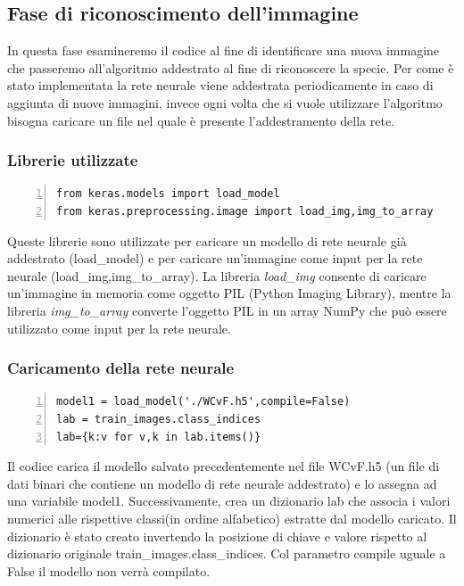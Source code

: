 \documentclass[a4paper,final,12pt]{report}
\begin{document}
\subsection{Fase di riconoscimento dell'immagine}
In questa fase esamineremo il codice al fine di identificare una nuova immagine che passeremo all'algoritmo addestrato al fine di riconoscere la specie. Per come è stato implementata la rete neurale viene addestrata periodicamente in caso di aggiunta di nuove immagini, invece ogni volta che si vuole utilizzare l'algoritmo bisogna caricare un file nel quale è presente l'addestramento della rete.

\subsubsection{Librerie utilizzate}
\begin{lstlisting}[caption={Librerie per il riconosciemtno dell'immagine.}, label={lst:librerie_riconoscimento}, breaklines, escapechar=`\%, frame=lines, basicstyle=\small\ttfamily, keepspaces=true, numbers=left]
from keras.models import load_model
from keras.preprocessing.image import load_img,img_to_array
\end{lstlisting}
Queste librerie sono utilizzate per caricare un modello di rete neurale già addestrato (load\_model) e per caricare un'immagine come input per la rete neurale (load\_img,img\_to\_array). La libreria \textit{load\_img} consente di caricare un'immagine in memoria come oggetto PIL (Python Imaging Library), mentre la libreria \textit{img\_to\_array} converte l'oggetto PIL in un array NumPy che può essere utilizzato come input per la rete neurale.

\subsubsection{Caricamento della rete neurale}
\begin{lstlisting}[caption={Codice di caricamento della rete neurale.}, label={lst:caricamento_rete}, breaklines, escapechar=`\%, frame=lines, basicstyle=\small\ttfamily, keepspaces=true, numbers=left]
model1 = load_model('./WCvF.h5',compile=False)
lab = train_images.class_indices
lab={k:v for v,k in lab.items()}
\end{lstlisting}
Il codice carica il modello salvato precedentemente nel file WCvF.h5 (un file di dati binari che contiene un modello di rete neurale addestrato) e lo assegna ad una variabile model1. Successivamente, crea un dizionario lab che associa i valori numerici alle rispettive classi(in ordine alfabetico) estratte dal modello caricato. Il dizionario è stato creato invertendo la posizione di chiave e valore rispetto al dizionario originale train\_images.class\_indices. Col parametro compile uguale a False il modello non verrà compilato.
\end{document}
